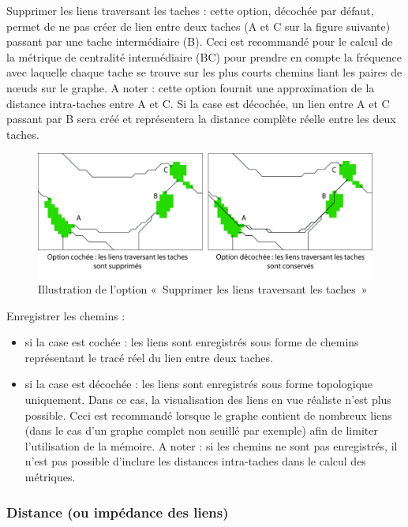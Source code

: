 \documentclass{article}
\begin{document}
Supprimer les liens traversant les taches : cette option, décochée par défaut, permet de ne pas créer de lien entre deux taches (A et C sur la figure suivante) passant par une tache intermédiaire (B). Ceci est recommandé pour le calcul de la métrique de centralité intermédiaire (BC) pour prendre en compte la fréquence avec laquelle chaque tache se trouve sur les plus courts chemins liant les paires de nœuds sur le graphe. A noter : cette option fournit une approximation de la distance intra-taches entre A et C. Si la case est décochée, un lien entre A et C passant par B sera créé et représentera la distance complète réelle entre les deux taches. 

\begin{figure}[H]
	\includegraphics[scale=0.5]{img/manual-fr_img5.png} 
	\caption{Illustration de l’option «~Supprimer les liens traversant les taches~»}
\end{figure}
 

Enregistrer les chemins : 
\begin{itemize}
	\item si la case est cochée : les liens sont enregistrés sous forme de chemins représentant le tracé réel du lien entre deux taches. 
	\item si la case est décochée : les liens sont enregistrés sous forme topologique uniquement.  Dans ce cas, la visualisation des liens en vue réaliste n’est plus possible. Ceci est recommandé lorsque le graphe contient de nombreux liens (dans le cas d’un graphe complet non seuillé par exemple) afin de limiter l’utilisation de la mémoire. A noter : si les chemins ne sont pas enregistrés, il n’est pas possible d’inclure les distances intra-taches dans le calcul des métriques.
\end{itemize}


\subsubsection{Distance (ou impédance des liens)}
\end{document}
